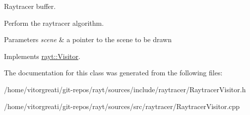 Raytracer buffer. 

Perform the raytracer algorithm.


\begin{DoxyParams}{Parameters}
{\em scene} & a pointer to the scene to be drawn \\
\hline
\end{DoxyParams}


Implements \mbox{\hyperlink{classrayt_1_1_visitor_a86711f9694cba733e9ce9c7720ee9197}{rayt\+::\+Visitor}}.



The documentation for this class was generated from the following files\+:\begin{DoxyCompactItemize}
\item 
/home/vitorgreati/git-\/repos/rayt/sources/include/raytracer/Raytracer\+Visitor.\+h\item 
/home/vitorgreati/git-\/repos/rayt/sources/src/raytracer/Raytracer\+Visitor.\+cpp\end{DoxyCompactItemize}
